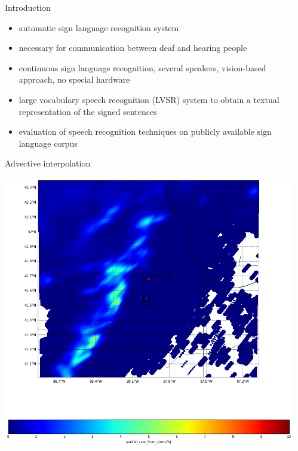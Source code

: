 \documentclass[final]{beamer}
\begin{document}
\begin{frame}{}
\begin{columns}[t]
\begin{column}{.3\linewidth}
      \begin{block}{Introduction}
        \begin{itemize}
        \item automatic sign language recognition system                                    %
        \item \alert{necessary for communication} between deaf and
          hearing people
        \item \alert{continuous} sign language recognition,
          \alert{several} speakers, \alert{vision-based} approach, \alert{no
            special hardware}
        \item large vocabulary speech recognition (LVSR) system to
          obtain a textual representation of the signed
          sentences 
        \item evaluation of speech recognition techniques on \alert{publicly
          available sign language
          corpus}
        \end{itemize}
      \end{block}

 \begin{block}{Advective interpolation}

           \includegraphics[width=0.7\linewidth]{figures/aggregate.png}\\[1ex]                      
  
      \end{block}
    \end{column}

  \begin{column}{.3\linewidth}
  \vfill
 

\end{column}
\end{columns}
\end{frame}
\end{document}
